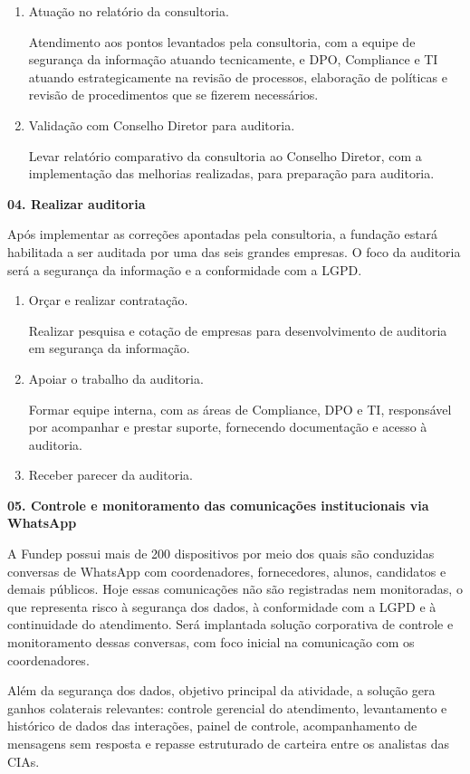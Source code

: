 \documentclass[12pt,a4paper]{article}
\newcommand{\atividade}[1]{%
  \par{\bfseries\color{azulAtividade}#1}\par
}
\begin{document}
\begin{enumerate}
  \item Atuação no relatório da consultoria.

        Atendimento aos pontos levantados pela consultoria, com a equipe de segurança da informação atuando tecnicamente, e DPO, Compliance e TI atuando estrategicamente na revisão de processos, elaboração de políticas e revisão de procedimentos que se fizerem necessários.
  \item Validação com Conselho Diretor para auditoria.

        Levar relatório comparativo da consultoria ao Conselho Diretor, com a implementação das melhorias realizadas, para preparação para auditoria.
\end{enumerate}

\atividade{04. Realizar auditoria}

Após implementar as correções apontadas pela consultoria, a fundação estará habilitada a ser auditada por uma das seis grandes empresas. O foco da auditoria será a segurança da informação e a conformidade com a LGPD.

\begin{enumerate}
  \item Orçar e realizar contratação.

        Realizar pesquisa e cotação de empresas para desenvolvimento de auditoria em segurança da informação.
  \item Apoiar o trabalho da auditoria.

        Formar equipe interna, com as áreas de Compliance, DPO e TI, responsável por acompanhar e prestar suporte, fornecendo documentação e acesso à auditoria.
  \item Receber parecer da auditoria.
\end{enumerate}

\atividade{05. Controle e monitoramento das comunicações institucionais via WhatsApp}

A Fundep possui mais de 200 dispositivos por meio dos quais são conduzidas conversas de WhatsApp com coordenadores, fornecedores, alunos, candidatos e demais públicos. Hoje essas comunicações não são registradas nem monitoradas, o que representa risco à segurança dos dados, à conformidade com a LGPD e à continuidade do atendimento. Será implantada solução corporativa de controle e monitoramento dessas conversas, com foco inicial na comunicação com os coordenadores.

Além da segurança dos dados, objetivo principal da atividade, a solução gera ganhos colaterais relevantes: controle gerencial do atendimento, levantamento e histórico de dados das interações, painel de controle, acompanhamento de mensagens sem resposta e repasse estruturado de carteira entre os analistas das CIAs.
\end{document}
